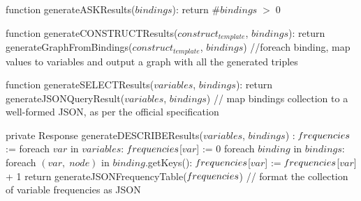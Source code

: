 function generateASKResults($bindings$):
    return $\#bindings \; > \; 0$

function generateCONSTRUCTResults($construct_{template}$, $bindings$):
    return generateGraphFromBindings($construct_{template}$, $bindings$) //foreach binding, map values to variables and output a graph with all the generated triples

function generateSELECTResults($variables$, $bindings$):
    return generateJSONQueryResult($variables$, $bindings$) // map bindings collection to a well-formed JSON, as per the official specification

private Response generateDESCRIBEResults($variables$, $bindings$) :
    $\textrm{\emph{f}}requencies$ := {}
    foreach $var$ in $variables$:
        $\textrm{\emph{f}}requencies$[$var$] := 0
    foreach $binding$ in $bindings$:
        foreach $(var, \; node)$ in $binding$.getKeys(): 
            $\textrm{\emph{f}}requencies$[$var$] := $\textrm{\emph{f}}requencies$[$var$] + 1
    return generateJSONFrequencyTable($\textrm{\emph{f}}requencies$) // format the collection of variable frequencies as JSON